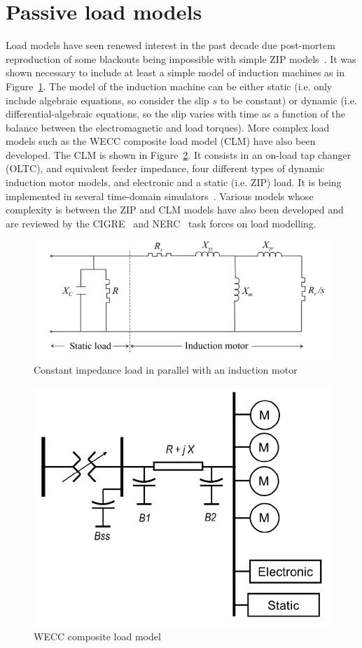 \section{Passive load models}
\label{sec:dynLoadModel}

Load models have seen renewed interest in the past decade due post-mortem reproduction of some blackouts being impossible with simple ZIP models~\cite[p11-12]{CIGREloadModels}. It was shown necessary to include at least a simple model of induction machines as in Figure~\ref{fig:motorLoad}. The model of the induction machine can be either static (i.e. only include algebraic equations, so consider the slip \(s\) to be constant) or dynamic (i.e. differential-algebraic equations, so the slip varies with time as a function of the balance between the electromagnetic and load torques). More complex load models such as the WECC composite load model (CLM) have also been developed. The CLM is shown in Figure~\ref{fig:WECC-CLM}. It consists in an on-load tap changer (OLTC), and equivalent feeder impedance, four different types of dynamic induction motor models, and electronic and a static (i.e. ZIP) load. It is being implemented in several time-domain simulators~\cite{NERCloadModelTF}. Various models whose complexity is between the ZIP and CLM models have also been developed and are reviewed by the CIGRE~\cite{CIGREloadModels} and NERC~\cite{NERCloadModelTF} task forces on load modelling.

\begin{figure}[t]
    \centering
    \includegraphics[width=0.6\linewidth]{Figs/MotorLoad.png}
    \caption{Constant impedance load in parallel with an induction motor~\cite{CIGREloadModels}}
    \label{fig:motorLoad}
\end{figure}

\begin{figure}[t]
    \centering
    \includegraphics[width=0.5\linewidth]{Figs/WECC-composite-load-model.png}
    \caption{WECC composite load model~\cite{NERCloadModelTF}}
    \label{fig:WECC-CLM}
\end{figure}

